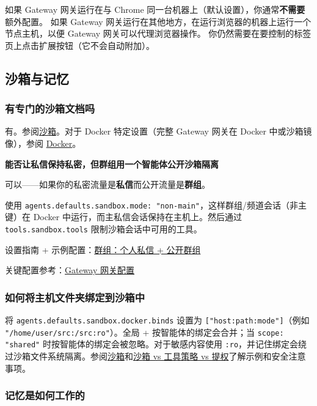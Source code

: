 如果 Gateway 网关运行在与 Chrome 同一台机器上（默认设置），你通常\textbf{不需要}额外配置。
如果 Gateway 网关运行在其他地方，在运行浏览器的机器上运行一个节点主机，以便 Gateway 网关可以代理浏览器操作。
你仍然需要在要控制的标签页上点击扩展按钮（它不会自动附加）。

\subsection{沙箱与记忆}


\subsubsection{有专门的沙箱文档吗}


有。参阅\href{/gateway/sandboxing}{沙箱}。对于 Docker 特定设置（完整 Gateway 网关在 Docker 中或沙箱镜像），参阅 \href{/install/docker}{Docker}。

\textbf{能否让私信保持私密，但群组用一个智能体公开沙箱隔离}

可以——如果你的私密流量是\textbf{私信}而公开流量是\textbf{群组}。

使用 \texttt{agents.defaults.sandbox.mode: "non-main"}，这样群组/频道会话（非主键）在 Docker 中运行，而主私信会话保持在主机上。然后通过 \texttt{tools.sandbox.tools} 限制沙箱会话中可用的工具。

设置指南 + 示例配置：\href{/channels/groups\#pattern-personal-dms-public-groups-single-agent}{群组：个人私信 + 公开群组}

关键配置参考：\href{/gateway/configuration\#agentsdefaultssandbox}{Gateway 网关配置}

\subsubsection{如何将主机文件夹绑定到沙箱中}


将 \texttt{agents.defaults.sandbox.docker.binds} 设置为 \texttt{["host:path:mode"]}（例如 \texttt{"/home/user/src:/src:ro"}）。全局 + 按智能体的绑定会合并；当 \texttt{scope: "shared"} 时按智能体的绑定会被忽略。对于敏感内容使用 \texttt{:ro}，并记住绑定会绕过沙箱文件系统隔离。参阅\href{/gateway/sandboxing\#custom-bind-mounts}{沙箱}和\href{/gateway/sandbox-vs-tool-policy-vs-elevated\#bind-mounts-security-quick-check}{沙箱 vs 工具策略 vs 提权}了解示例和安全注意事项。

\subsubsection{记忆是如何工作的}



